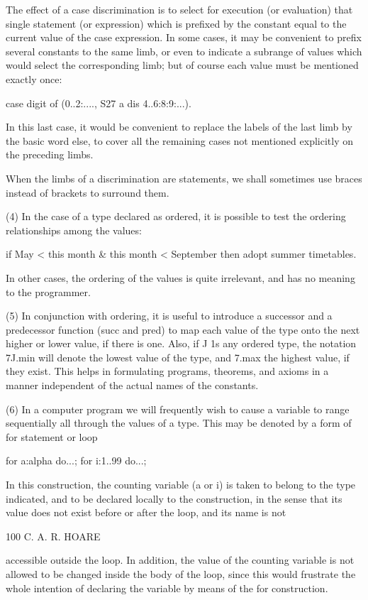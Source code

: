 The effect of a case discrimination is to select for execution (or evaluation) that single statement (or expression) which is prefixed by the constant equal to the current value of the case expression. In some cases, it may be convenient to prefix several constants to the same limb, or even to indicate a subrange of values which would select the corresponding limb; but of course each value must be mentioned exactly once:

case digit of (0..2:...., S27 a dis 4..6:8:9:...).

In this last case, it would be convenient to replace the labels of the last limb by the basic word else, to cover all the remaining cases not mentioned explicitly on the preceding limbs.

When the limbs of a discrimination are statements, we shall sometimes use braces instead of brackets to surround them.

(4) In the case of a type declared as ordered, it is possible to test the ordering relationships among the values:

if May < this month & this month < September then adopt summer timetables.

In other cases, the ordering of the values is quite irrelevant, and has no meaning to the programmer.

(5) In conjunction with ordering, it is useful to introduce a successor and a predecessor function (succ and pred) to map each value of the type onto the next higher or lower value, if there is one. Also, if J 1s any ordered type, the notation 7J.min will denote the lowest value of the type, and 7.max the highest value, if they exist. This helps in formulating programs, theorems, and axioms in a manner independent of the actual names of the constants.

(6) In a computer program we will frequently wish to cause a variable to range sequentially all through the values of a type. This may be denoted by a form of for statement or loop

for a:alpha do...; for i:1..99 do...;

In this construction, the counting variable (a or i) is taken to belong to the type indicated, and to be declared locally to the construction, in the sense that its value does not exist before or after the loop, and its name is not

100 C. A. R. HOARE

accessible outside the loop. In addition, the value of the counting variable is not allowed to be changed inside the body of the loop, since this would frustrate the whole intention of declaring the variable by means of the for construction.

